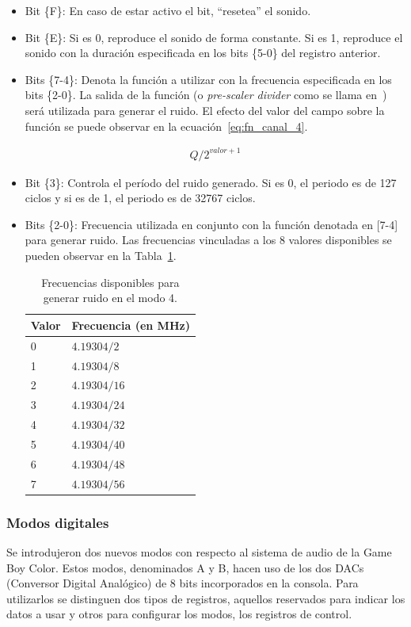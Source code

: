 \begin{itemize}
	\item Bit \{F\}: En caso de estar activo el bit, ``resetea'' el sonido.
	\item Bit \{E\}: Si es 0, reproduce el sonido de forma constante. Si es 1, reproduce el sonido con la duración especificada en los bits \{5-0\} del registro anterior.
	\item Bits \{7-4\}: Denota la función a utilizar con la frecuencia especificada en los bits \{2-0\}. La salida de la función (o \textit{pre-scaler divider} como se llama en~\cite{bib:belogic}) será utilizada para generar el ruido. El efecto del valor del campo sobre la función se puede observar en la ecuación~\ref{eq:fn_canal_4}.

	\begin{align}
		Q/2^{valor+1}
		\label{eq:fn_canal_4}
	\end{align}

	\item Bit \{3\}: Controla el período del ruido generado. Si es 0, el periodo es de 127 ciclos y si es de 1, el periodo es de 32767 ciclos.
	\item Bits \{2-0\}: Frecuencia utilizada en conjunto con la función denotada en [7-4] para generar ruido. Las frecuencias vinculadas a los 8 valores disponibles se pueden observar en la Tabla~\ref{tab:frec_canal_4}.

	\begin{table}[h]
		\centering
		\begin{tabular}{| l | l |}
			\hline
			\textbf{Valor} & \textbf{Frecuencia (en MHz)}  \\ \hline
			0 & $4.19304/2$ \\ \hline
			1 & $4.19304/8$ \\ \hline
			2 & $4.19304/16$ \\ \hline
			3 & $4.19304/24$ \\ \hline
			4 & $4.19304/32$ \\ \hline
			5 & $4.19304/40$ \\ \hline
			6 & $4.19304/48$ \\ \hline
			7 & $4.19304/56$ \\ \hline
		\end{tabular}
		\caption{Frecuencias disponibles para generar ruido en el modo 4.}\label{tab:frec_canal_4}
	\end{table}
	\FloatBarrier{}
\end{itemize}

\subsubsection{Modos digitales}
Se introdujeron dos nuevos modos con respecto al sistema de audio de la Game Boy Color. Estos modos, denominados A y B, hacen uso de los dos DACs (Conversor Digital Analógico) de 8 bits incorporados en la consola. Para utilizarlos se distinguen dos tipos de registros, aquellos reservados para indicar los datos a usar y otros para configurar los modos, los registros de control.

